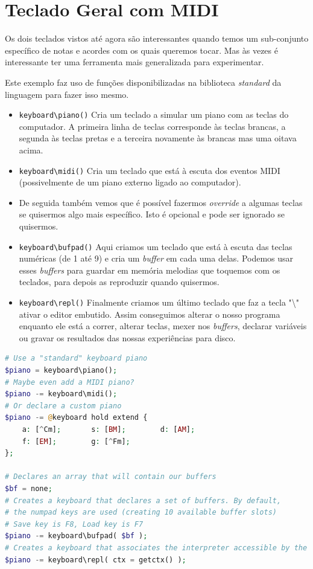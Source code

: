 \section{Teclado Geral com MIDI}
Os dois teclados vistos até agora são interessantes quando temos um sub-conjunto específico de notas e acordes com os quais queremos tocar. Mas às vezes é interessante ter uma ferramenta mais generalizada para experimentar.

Este exemplo faz uso de funções disponibilizadas na biblioteca \textit{standard} da linguagem para fazer isso mesmo. 

\begin{itemize}
 \item \texttt{keyboard\textbackslash{}piano()} Cria um teclado a simular um piano com as teclas do computador. A primeira linha de teclas corresponde às teclas brancas, a segunda às teclas pretas e a terceira novamente às brancas mas uma oitava acima.
 \item \texttt{keyboard\textbackslash{}midi()} Cria um teclado que está à escuta dos eventos MIDI (possivelmente de um piano externo ligado ao computador).
 \item De seguida também vemos que é possível fazermos \textit{override} a algumas teclas se quisermos algo mais específico. Isto é opcional e pode ser ignorado se quisermos.
 \item \texttt{keyboard\textbackslash{}bufpad()} Aqui criamos um teclado que está à escuta das teclas numéricas (de 1 até 9) e cria um \textit{buffer} em cada uma delas. Podemos usar esses \textit{buffers} para guardar em memória melodias que toquemos com os teclados, para depois as reproduzir quando quisermos.
 \item \texttt{keyboard\textbackslash{}repl()} Finalmente criamos um último teclado que faz a tecla "\textbackslash{}" ativar o editor embutido. Assim conseguimos alterar o nosso programa enquanto ele está a correr, alterar teclas, mexer nos \textit{buffers}, declarar variáveis ou gravar os resultados das nossas experiências para disco.
\end{itemize}


\begin{lstlisting}[caption=Exemplo da sintaxe proposta da linguagem,language=PHP]
# Use a "standard" keyboard piano
$piano = keyboard\piano();
# Maybe even add a MIDI piano?
$piano -= keyboard\midi();
# Or declare a custom piano
$piano -= @keyboard hold extend {
    a: [^Cm];       s: [BM];        d: [AM];
    f: [EM];        g: [^Fm];       
};

# Declares an array that will contain our buffers
$bf = none;
# Creates a keyboard that declares a set of buffers. By default, 
# the numpad keys are used (creating 10 available buffer slots)
# Save key is F8, Load key is F7
$piano -= keyboard\bufpad( $bf );
# Creates a keyboard that associates the interpreter accessible by the "\" key
$piano -= keyboard\repl( ctx = getctx() );
\end{lstlisting}

